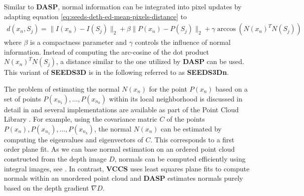 Similar to \textbf{DASP}, normal information can be integrated into pixel updates by adapting equation \eqref{eq:seeds-deth-ed-mean-pixels-distance} to
\begin{align}
	\label{eq:seeds-depth-3d-normal-mean-pixels-distance}
	d(x_n, S_j) = \|I(x_n) - I(S_j)\|_2 + \beta\|P(x_n) - P(S_j)\|_2 + \gamma  \arccos \left(N(x_n)^T N(S_j) \right)
\end{align}
where $\beta$ is a compactness parameter and $\gamma$ controls the influence of normal information. Instead of computing the arc-cosine of the dot product $N(x_n)^T N(S_j)$, a distance similar to the one utilized by \textbf{DASP} can be used. This variant of \textbf{SEEDS3D} is in the following referred to as \textbf{SEEDS3Dn}.

The problem of estimating the normal $N(x_n)$ for the point $P(x_n)$ based on a set of points $P(x_{n_1}), \ldots, P(x_{n_k})$ within its local neighborhood is discussed in detail in \cite{Rusu:2009} and several implementations are available as part of the Point Cloud Library \cite{RusuCousins:2011}. For example, using the covariance matric $C$ of the points $P(x_n), P(x_{n_1}), \ldots, P(x_{n_k})$, the normal $N(x_n)$ can be estimated by computing the eigenvalues and eigenvectors of $C$. This corresponds to a first order plane fit. As we can base normal estimation on an ordered point cloud constructed from the depth image $D$, normals can be computed efficiently using integral images, see \cite{HolzerRusuDixonGedikliNavab:2012}. In contrast, \textbf{VCCS} uses least squares plane fits to compute normals within an unordered point cloud and \textbf{DASP} estimates normals purely based on the depth gradient $\nabla D$.


